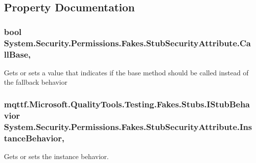 \subsection{Property Documentation}
\hypertarget{class_system_1_1_security_1_1_permissions_1_1_fakes_1_1_stub_security_attribute_a4712f2ac041f02fa1bdbe54ea7e77e57}{
\subsubsection[{Call\-Base}]{\setlength{\rightskip}{0pt plus 5cm}bool System.\-Security.\-Permissions.\-Fakes.\-Stub\-Security\-Attribute.\-Call\-Base\hspace{0.3cm}{\ttfamily [get]}, {\ttfamily [set]}}}\label{class_system_1_1_security_1_1_permissions_1_1_fakes_1_1_stub_security_attribute_a4712f2ac041f02fa1bdbe54ea7e77e57}


Gets or sets a value that indicates if the base method should be called instead of the fallback behavior

\hypertarget{class_system_1_1_security_1_1_permissions_1_1_fakes_1_1_stub_security_attribute_adb60db036dc6a607d58455148212edf9}{
\subsubsection[{Instance\-Behavior}]{\setlength{\rightskip}{0pt plus 5cm}mqttf.\-Microsoft.\-Quality\-Tools.\-Testing.\-Fakes.\-Stubs.\-I\-Stub\-Behavior System.\-Security.\-Permissions.\-Fakes.\-Stub\-Security\-Attribute.\-Instance\-Behavior\hspace{0.3cm}{\ttfamily [get]}, {\ttfamily [set]}}}\label{class_system_1_1_security_1_1_permissions_1_1_fakes_1_1_stub_security_attribute_adb60db036dc6a607d58455148212edf9}


Gets or sets the instance behavior.

